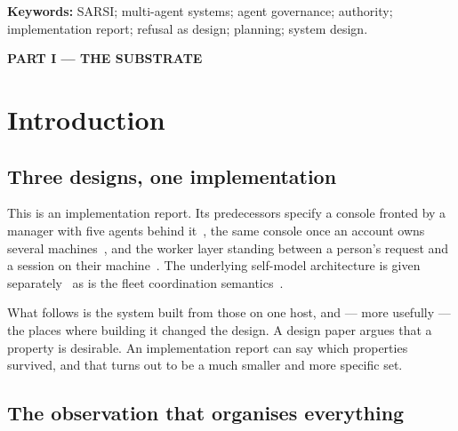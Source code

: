 \documentclass[11pt]{article}
\begin{document}
\begin{abstract}
\textbf{And precedence is mechanical.} Entering interact mode pauses the worker's steering, because otherwise the worker types its next step into a terminal the owner is using and the two contend for the prompt.

Part~II specifies all nineteen planes: what each holds, what it refuses, its interface, its characteristic failure, and its deployment status. A closing section lists what remains unbuilt.
\end{abstract}

\vspace{2pt}
\noindent\textbf{Keywords:} SARSI; multi-agent systems; agent governance; authority; implementation report; refusal as design; planning; system design.

\tableofcontents

\newpage
\begin{center}\large\bfseries PART I --- THE SUBSTRATE\end{center}

\section{Introduction}
\label{sec:intro}

\subsection{Three designs, one implementation}

This is an implementation report. Its predecessors specify a console fronted by a manager with five agents behind it~\citep{yang2026console}, the same console once an account owns several machines~\citep{yang2026account}, and the worker layer standing between a person's request and a session on their machine~\citep{yang2026worker}. The underlying self-model architecture is given separately~\citep{yang2026v2corrected,yang2026history} as is the fleet coordination semantics~\citep{yang2026manager}.

What follows is the system built from those on one host, and --- more usefully --- the places where building it changed the design. A design paper argues that a property is desirable. An implementation report can say which properties survived, and that turns out to be a much smaller and more specific set.

\subsection{The observation that organises everything}
\end{document}

